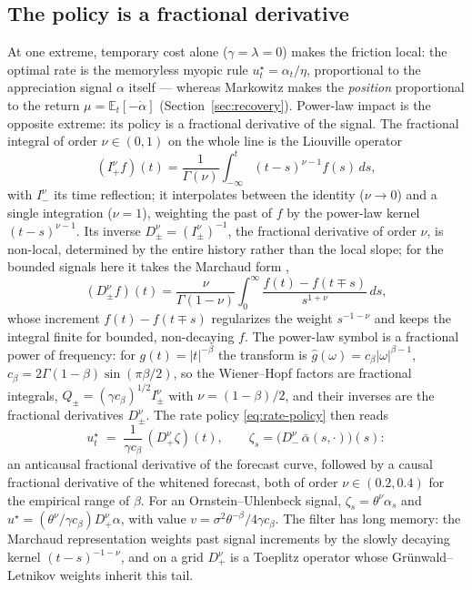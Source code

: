 \documentclass[11pt]{article}
\newcommand{\E}{\mathbb{E}}
\theoremstyle{plain}
\theoremstyle{definition}
\theoremstyle{remark}
\begin{document}
\subsection{The policy is a fractional derivative}\label{sec:fracpolicy}

At one extreme, temporary cost alone ($\gamma=\lambda=0$) makes the friction local: the optimal rate is the memoryless myopic rule $u^\star_t=\alpha_t/\eta$, proportional to the appreciation signal $\alpha$ itself --- whereas Markowitz makes the \emph{position} proportional to the return $\mu=\E_t[-\dot\alpha]$ (Section~\ref{sec:recovery}). Power-law impact is the opposite extreme: its policy is a fractional derivative of the signal. The fractional integral of order $\nu\in(0,1)$ on the whole line is the Liouville operator
\[
(I^\nu_+f)(t)=\frac{1}{\Gamma(\nu)}\int_{-\infty}^t(t-s)^{\nu-1}f(s)\,ds,
\]
with $I^\nu_-$ its time reflection; it interpolates between the identity ($\nu\to0$) and a single integration ($\nu=1$), weighting the past of $f$ by the power-law kernel $(t-s)^{\nu-1}$. Its inverse $D^\nu_\pm=(I^\nu_\pm)^{-1}$, the fractional derivative of order $\nu$, is non-local, determined by the entire history rather than the local slope; for the bounded signals here it takes the Marchaud form \citep{SamkoKilbasMarichev1993},
\[
(D^\nu_\pm f)(t)=\frac{\nu}{\Gamma(1-\nu)}\int_0^\infty\frac{f(t)-f(t\mp s)}{s^{1+\nu}}\,ds,
\]
whose increment $f(t)-f(t\mp s)$ regularizes the weight $s^{-1-\nu}$ and keeps the integral finite for bounded, non-decaying $f$. The power-law symbol is a fractional power of frequency: for $g(t)=|t|^{-\beta}$ the transform is $\hat g(\omega)=c_\beta|\omega|^{\beta-1}$, $c_\beta=2\Gamma(1-\beta)\sin(\pi\beta/2)$, so the Wiener--Hopf factors are fractional integrals, $Q_\pm=(\gamma c_\beta)^{1/2}I^\nu_\pm$ with $\nu=(1-\beta)/2$, and their inverses are the fractional derivatives $D^\nu_\pm$. The rate policy \eqref{eq:rate-policy} then reads
\begin{equation}\label{eq:fractional}
u^\star_t \;=\; \frac{1}{\gamma c_\beta}\,(D_+^\nu\zeta)(t), \qquad
\zeta_s = \bigl(D_-^\nu\,\bar\alpha(s,\cdot)\bigr)(s):
\end{equation}
an anticausal fractional derivative of the forecast curve, followed by a causal fractional derivative of the whitened forecast, both of order $\nu\in(0.2,0.4)$ for the empirical range of $\beta$. For an Ornstein--Uhlenbeck signal, $\zeta_s=\theta^\nu\alpha_s$ and $u^\star=(\theta^\nu/\gamma c_\beta)D^\nu_+\alpha$, with value $v=\sigma^2\theta^{-\beta}/4\gamma c_\beta$. The filter has long memory: the Marchaud representation weights past signal increments by the slowly decaying kernel $(t-s)^{-1-\nu}$, and on a grid $D^\nu_+$ is a Toeplitz operator whose Gr\"unwald--Letnikov weights inherit this tail.
\end{document}
